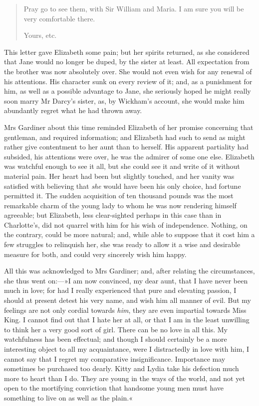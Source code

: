 \begin{quotation}
Pray go to see them, with Sir William and Maria. I am sure you will be very comfortable there.

\begin{flushright}
Yours, etc.
\end{flushright}
\end{quotation}

This letter gave Elizabeth some pain; but her spirits returned, as she considered that Jane would no longer be duped, by the sister at least. All expectation from the brother was now absolutely over. She would not even wish for any renewal of his attentions. His character sunk on every review of it; and, as a punishment for him, as well as a possible advantage to Jane, she seriously hoped he might really soon marry Mr Darcy's sister, as, by Wickham's account, she would make him abundantly regret what he had thrown away.

Mrs Gardiner about this time reminded Elizabeth of her promise concerning that gentleman, and required information; and Elizabeth had such to send as might rather give contentment to her aunt than to herself. His apparent partiality had subsided, his attentions were over, he was the admirer of some one else. Elizabeth was watchful enough to see it all, but she could see it and write of it without material pain. Her heart had been but slightly touched, and her vanity was satisfied with believing that \textit{she} would have been his only choice, had fortune permitted it. The sudden acquisition of ten thousand pounds was the most remarkable charm of the young lady to whom he was now rendering himself agreeable; but Elizabeth, less clear-sighted perhaps in this case than in Charlotte's, did not quarrel with him for his wish of independence. Nothing, on the contrary, could be more natural; and, while able to suppose that it cost him a few struggles to relinquish her, she was ready to allow it a wise and desirable measure for both, and could very sincerely wish him happy.

All this was acknowledged to Mrs Gardiner; and, after relating the circumstances, she thus went on:—»I am now convinced, my dear aunt, that I have never been much in love; for had I really experienced that pure and elevating passion, I should at present detest his very name, and wish him all manner of evil. But my feelings are not only cordial towards \textit{him}, they are even impartial towards Miss King. I cannot find out that I hate her at all, or that I am in the least unwilling to think her a very good sort of girl. There can be no love in all this. My watchfulness has been effectual; and though I should certainly be a more interesting object to all my acquaintance, were I distractedly in love with him, I cannot say that I regret my comparative insignificance. Importance may sometimes be purchased too dearly. Kitty and Lydia take his defection much more to heart than I do. They are young in the ways of the world, and not yet open to the mortifying conviction that handsome young men must have something to live on as well as the plain.«